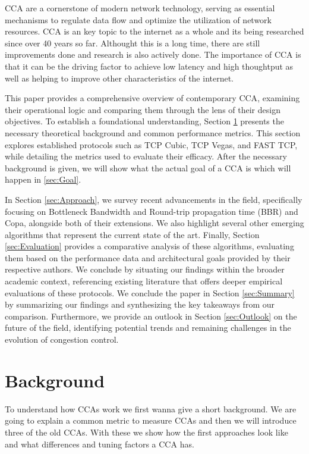 \documentclass[conference]{IEEEtran}
\begin{document}
\ac{CCA} are a cornerstone of modern network technology, serving as essential mechanisms to regulate data flow and optimize the utilization of network resources. 
\ac{CCA} is an key topic to the internet as a whole and its being researched since over 40 years so far.
Althought this is a long time, there are still improvements done and research is also actively done.
The importance of \ac{CCA} is that it can be the driving factor to achieve low latency and high thoughtput as well as helping to improve other characteristics of the internet.

This paper provides a comprehensive overview of contemporary \acs{CCA}, examining their operational logic and comparing them through the lens of their design objectives.
To establish a foundational understanding, Section \ref{sec:Background} presents the necessary theoretical background and common performance metrics. 
This section explores established protocols such as TCP Cubic, TCP Vegas, and FAST TCP, while detailing the metrics used to evaluate their efficacy.
After the necessary background is given, we will show what the actual goal of a \ac{CCA} is which will happen in \ref{sec:Goal}.

In Section \ref{sec:Approach}, we survey recent advancements in the field, specifically focusing on Bottleneck Bandwidth and Round-trip propagation time (BBR) and Copa, alongside both of their extensions. 
We also highlight several other emerging algorithms that represent the current state of the art.
Finally, Section \ref{sec:Evaluation} provides a comparative analysis of these algorithms, evaluating them based on the performance data and architectural goals provided by their respective authors. 
We conclude by situating our findings within the broader academic context, referencing existing literature that offers deeper empirical evaluations of these protocols.
We conclude the paper in Section \ref{sec:Summary} by summarizing our findings and synthesizing the key takeaways from our comparison. 
Furthermore, we provide an outlook in Section \ref{sec:Outlook} on the future of the field, identifying potential trends and remaining challenges in the evolution of congestion control.
 
\section{Background}\label{sec:Background}

To understand how \ac{CCA}s work we first wanna give a short background.
We are going to explain a common metric to measure \ac{CCA}s and then we will introduce three of the old \ac{CCA}s. 
With these we show how the first approaches look like and what differences and tuning factors a \ac{CCA} has.
\end{document}
